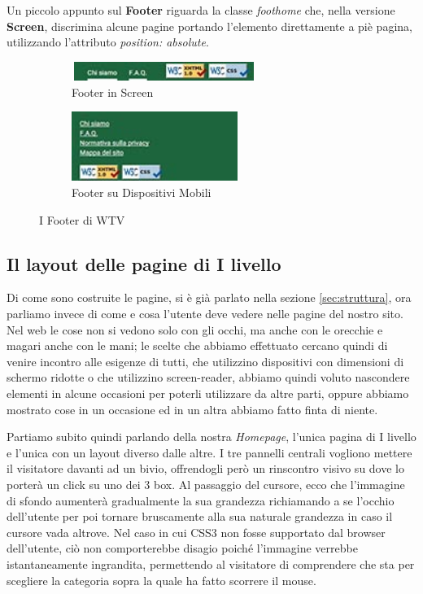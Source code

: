 Un piccolo appunto sul \textbf{Footer} riguarda la classe \textit{foothome} che, nella versione \textbf{Screen}, discrimina alcune pagine portando l'elemento direttamente a piè pagina, utilizzando l'attributo \textit{position: absolute}.
\begin{figure}[h!]
        \centering
        \begin{subfigure}[b]{0.3\textwidth}
                \includegraphics[height=0.62cm,width=6cm]{images/pres_footer.jpg}
                \caption{Footer in Screen}
                \label{fig:Footer-screen}
        \end{subfigure}
        \hspace{4cm}
        \begin{subfigure}[b]{0.3\textwidth}
                \includegraphics[height=2.25cm,width=5.4cm]{images/pres_footer_m.jpg}
                \caption{Footer su Dispositivi Mobili}
                \label{fig:Footer-mobile}
        \end{subfigure}
        \caption{I Footer di WTV}\label{fig:Display-Footer}
\end{figure}

\subsection{Il layout delle pagine di I livello}\label{sec:Pres-Iliv}
Di come sono costruite le pagine, si è già parlato nella sezione \ref{sec:struttura}, ora parliamo invece di come e cosa l'utente deve vedere nelle pagine del nostro sito.
Nel web le cose non si vedono solo con gli occhi, ma anche con le orecchie e magari anche con le mani; le scelte che abbiamo effettuato cercano quindi di venire incontro alle esigenze di tutti, che utilizzino dispositivi con dimensioni di schermo ridotte o che utilizzino screen-reader, abbiamo quindi voluto nascondere elementi in alcune occasioni per poterli utilizzare da altre parti, oppure abbiamo mostrato cose in un occasione ed in un altra abbiamo fatto finta di niente.

Partiamo subito quindi parlando della nostra \textit{Homepage}, l'unica pagina di I livello e l'unica con un layout diverso dalle altre. I tre pannelli centrali vogliono mettere il visitatore davanti ad un bivio, offrendogli però un rinscontro visivo su dove lo porterà un click su uno dei 3 box. Al passaggio del cursore, ecco che l'immagine di sfondo aumenterà gradualmente la sua grandezza richiamando a se l'occhio dell'utente per poi tornare bruscamente alla sua naturale grandezza in caso il cursore vada altrove. Nel caso in cui CSS3 non fosse supportato dal browser dell'utente, ciò non comporterebbe disagio poiché l'immagine verrebbe istantaneamente ingrandita, permettendo al visitatore di comprendere che sta per scegliere la categoria sopra la quale ha fatto scorrere il mouse.

